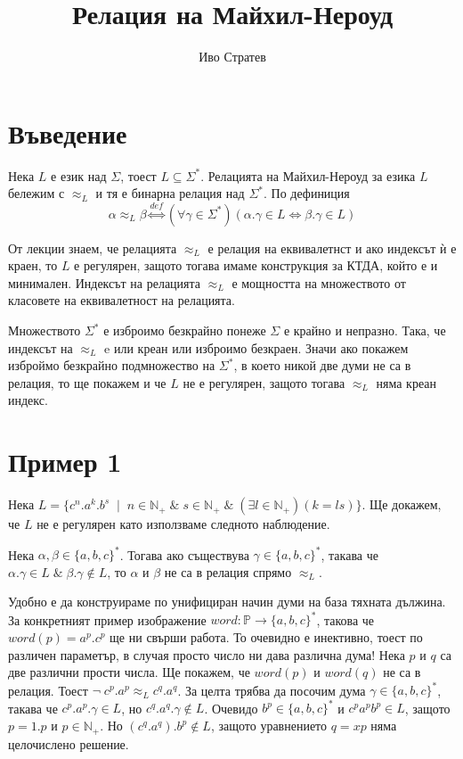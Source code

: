 \documentclass[12pt]{article}
\title{Релация на Майхил-Нероуд}
\author{Иво Стратев}
\begin{document}
\maketitle

\section{Въведение}
Нека \(L\) е език над \(\Sigma\), тоест \(L \subseteq \Sigma^*\).
Релацията на Майхил-Нероуд за езика \(L\) бележим с \(\approx_L\) и тя е бинарна релация над \(\Sigma^*\).
По дефиниция
\[\alpha \approx_L \beta \overset{def}{\iff} (\forall \gamma \in \Sigma^*)(\alpha.\gamma \in L \iff \beta.\gamma \in L)\]

От лекции знаем, че релацията \(\approx_L\) е релация на еквивалетнст и ако индексът ѝ е краен, то \(L\) е регулярен, защото тогава имаме конструкция за КТДА, който е и минимален.
Индексът на релацията \(\approx_L\) е мощността на множеството от класовете на еквивалетност на релацията.

\vspace*{5mm}

\par Множеството \(\Sigma^*\) е изброимо безкрайно понеже \(\Sigma\) е крайно и непразно.
Така, че индексът на \(\approx_L\) e или креан или изброимо безкраен.
Значи ако покажем изброймо безкрайно подмножество на \(\Sigma^*\), в което никой две думи не са в релация, то ще покажем и че \(L\) не е регулярен, защото тогава \(\approx_L\) няма креан индекс.

\section{Пример 1}

Нека \(L = \{c^n.a^k.b^s \; \mid\; n \in \mathbb{N}_+ \;\&\; s \in \mathbb{N}_+ \;\&\; (\exists l \in \mathbb{N}_+)(k = ls)\}\).
Ще докажем, че \(L\) не е регулярен като използваме следното наблюдение.

Нека \(\alpha, \beta \in \{a, b, c\}^*\). Тогава ако съществува \(\gamma \in \{a, b, c\}^*\), такава че
\(\alpha.\gamma \in L \;\&\; \beta.\gamma \notin L\), то \(\alpha\) и \(\beta\) не са в релация спрямо \(\approx_L\).

\vspace*{5mm}

\par Удобно е да конструираме по унифициран начин думи на база тяхната дължина.
За конкретният пример изображение \(word : \mathbb P \to \{a, b, c\}^*\), такова че \(word(p) = a^p.c^p\) ще ни свърши работа.
То очевидно е инективно, тоест по различен параметър, в случая просто число ни дава различна дума!
Нека \(p\) и \(q\) са две различни прости числа. Ще покажем, че \(word(p)\) и \(word(q)\) не са в релация.
Тоест \(\lnot \; c^p.a^p \approx_L c^q.a^q \). За целта трябва да посочим дума \(\gamma \in \{a, b, c\}^*\),
такава че \(c^p.a^p.\gamma \in L\), но \(c^q.a^q.\gamma \notin L\).
Очевидо \(b^p \in \{a, b, c\}^*\) и \(c^pa^pb^p \in L\), защото \(p = 1.p\) и \(p \in \mathbb{N}_+\).
Но \((c^q.a^q).b^p \notin L\), защото уравнението \(q = xp\) няма целочислено решение.
\end{document}
